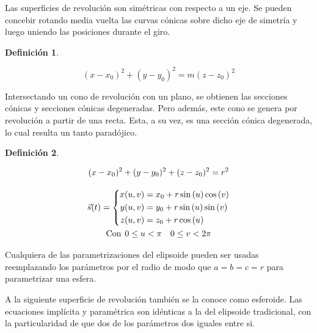 \documentclass[a5paper,12pt,twoside]{book}
\newtheorem{defn}{{Definición}}[chapter]
\begin{document}

Las superficies de revolución son simétricas con respecto a un eje. Se pueden concebir rotando media vuelta las curvas cónicas sobre dicho eje de simetría y luego uniendo las posiciones durante el giro.

\begin{mdframed}[style=MyFrame1]
    \begin{defn}
    \end{defn}
    \begin{equation*}
        (x-x_0)^2 + (y-y_0)^2 = m\left(z-z_0\right)^2
    \end{equation*}
\end{mdframed}

Intersectando un cono de revolución con un plano, se obtienen las secciones cónicas y secciones cónicas degeneradas. Pero además, este cono se genera por revolución a partir de una recta. Esta, a su vez,
es una sección cónica degenerada, lo cual resulta un tanto paradójico.

\begin{mdframed}[style=MyFrame1]
    \begin{defn}
    \end{defn}
    \begin{gather*}
        (x-x_0)^2 + (y-y_0)^2 + (z-z_0)^2 = r^2
        \\[1em]
        \Vec{s}(t) = \left\{
        \begin{aligned}
            x(u,v) &= x_0 + r \sin{(u)} \cos{(v)} \\
            y(u,v) &= y_0 + r \sin{(u)} \sin{(v)} \\
            z(u,v) &= z_0 + r \cos{(u)}
        \end{aligned}
        \right.
        \\
        \textrm{Con} \hspace{1ex} 0 \leq u < \pi \quad 0 \leq v < 2 \pi
    \end{gather*}
\end{mdframed}

Cualquiera de las parametrizaciones del elipsoide pueden ser usadas reemplazando los parámetros por el radio de modo que $a=b=c=r$ para parametrizar una esfera.

A la siguiente superficie de revolución también se la conoce como esferoide. Las ecuaciones implícita y paramétrica son idénticas a la del elipsoide tradicional, con la particularidad de que dos de los parámetros dos iguales entre si.
\end{document}
